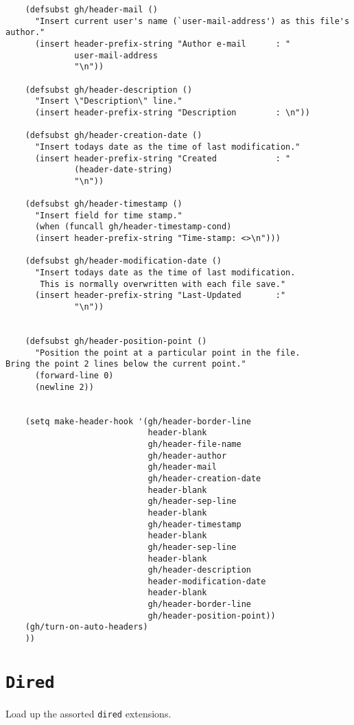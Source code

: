 \documentclass[11pt]{article}
\begin{document}
\begin{verbatim}
    (defsubst gh/header-mail ()
      "Insert current user's name (`user-mail-address') as this file's author."
      (insert header-prefix-string "Author e-mail      : "
              user-mail-address
              "\n"))

    (defsubst gh/header-description ()
      "Insert \"Description\" line."
      (insert header-prefix-string "Description        : \n"))

    (defsubst gh/header-creation-date ()
      "Insert todays date as the time of last modification."
      (insert header-prefix-string "Created            : "
              (header-date-string)
              "\n"))

    (defsubst gh/header-timestamp ()
      "Insert field for time stamp."
      (when (funcall gh/header-timestamp-cond)
      (insert header-prefix-string "Time-stamp: <>\n")))

    (defsubst gh/header-modification-date ()
      "Insert todays date as the time of last modification.
       This is normally overwritten with each file save."
      (insert header-prefix-string "Last-Updated       :"
              "\n"))


    (defsubst gh/header-position-point ()
      "Position the point at a particular point in the file.
Bring the point 2 lines below the current point."
      (forward-line 0)
      (newline 2))


    (setq make-header-hook '(gh/header-border-line
                             header-blank
                             gh/header-file-name
                             gh/header-author
                             gh/header-mail
                             gh/header-creation-date
                             header-blank
                             gh/header-sep-line
                             header-blank
                             gh/header-timestamp
                             header-blank
                             gh/header-sep-line
                             header-blank
                             gh/header-description
                             header-modification-date
                             header-blank
                             gh/header-border-line
                             gh/header-position-point))
    (gh/turn-on-auto-headers)
    ))

\end{verbatim}

\section{\texttt{Dired}}
\label{sec:org0cdb77a}
Load up the assorted \texttt{dired} extensions.
\end{document}
